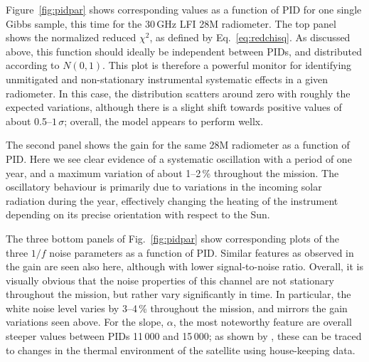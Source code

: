 \documentclass[onecolumn]{aa}
\renewcommand{\d}[0]{\vec{d}}
\newcommand{\s}[0]{\vec{s}}
\newcommand{\BP}{\textsc{BeyondPlanck}}
\begin{document}
Figure~\ref{fig:pidpar} shows corresponding values as a function of
PID for one single Gibbs sample, this time for the 30\,GHz LFI 28M
radiometer. The top panel shows the normalized reduced $\chi^2$, as
defined by Eq.~\eqref{eq:redchisq}. As discussed above, this function
should ideally be independent between PIDs, and distributed according
to $N(0,1)$. This plot is therefore a powerful monitor for identifying
unmitigated and non-stationary instrumental systematic effects in a
given radiometer. In this case, the distribution scatters around zero
with roughly the expected variations, although there is a slight shift
towards positive values of about 0.5--$1\,\sigma$; overall, the model
appears to perform wellx.


The second panel shows the gain for the same 28M radiometer as a
function of PID. Here we see clear evidence of a systematic
oscillation with a period of one year, and a maximum variation of
about 1--2\,\% throughout the mission. The oscillatory behaviour is
primarily due to variations in the incoming solar radiation during the
year, effectively changing the heating of the instrument depending on its
precise orientation with respect to the Sun.

The three bottom panels of Fig.~\ref{fig:pidpar} show corresponding
plots of the three $1/f$ noise parameters as a function of
PID. Similar features as observed in the gain are seen also here,
although with lower signal-to-noise ratio. Overall, it is visually
obvious that the noise properties of this channel are not stationary
throughout the mission, but rather vary significantly in time. In
particular, the white noise level varies by 3--4\,\% throughout the
mission, and mirrors the gain variations seen above. For the slope,
$\alpha$, the most noteworthy feature are overall steeper values
between PIDs 11\,000 and 15\,000; as shown by \citet{bp06}, these can
be traced to changes in the thermal environment of the satellite using
house-keeping data.
\end{document}
